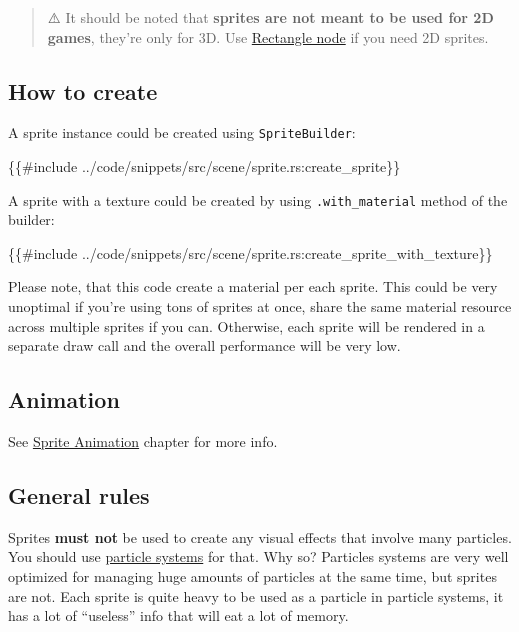\documentclass[
]{book}
\newenvironment{Shaded}{\begin{snugshade}}{\end{snugshade}}
\newcommand{\NormalTok}[1]{#1}
\theoremstyle{definition}
\theoremstyle{definition}
\theoremstyle{definition}
\theoremstyle{definition}
\theoremstyle{remark}
\begin{document}
\begin{quote}
⚠️ It should be noted that \textbf{sprites are not meant to be used for 2D games}, they're only for 3D. Use \href{./rectangle.md}{Rectangle node} if you need 2D sprites.
\end{quote}

\subsection{How to create}\label{how-to-create-4}

A sprite instance could be created using \texttt{SpriteBuilder}:

\begin{Shaded}
\begin{Highlighting}[]
\NormalTok{\{\{\#include ../code/snippets/src/scene/sprite.rs:create\_sprite\}\}}
\end{Highlighting}
\end{Shaded}

A sprite with a texture could be created by using \texttt{.with\_material} method of the builder:

\begin{Shaded}
\begin{Highlighting}[]
\NormalTok{\{\{\#include ../code/snippets/src/scene/sprite.rs:create\_sprite\_with\_texture\}\}}
\end{Highlighting}
\end{Shaded}

Please note, that this code create a material per each sprite. This could be very unoptimal if you're using tons of sprites at once, share the same material resource across multiple sprites if you can. Otherwise, each sprite will be rendered in a separate draw call and the overall performance will be very low.

\subsection{Animation}\label{animation-2}

See \href{../animation/spritesheet/spritesheet.md}{Sprite Animation} chapter for more info.

\subsection{General rules}\label{general-rules}

Sprites \textbf{must not} be used to create any visual effects that involve many particles. You should use \href{particle_system_node.md}{particle systems} for that. Why so? Particles systems are very well optimized for managing huge amounts of particles at the same time, but sprites are not. Each sprite is quite heavy to be used as a particle in particle systems, it has a lot of ``useless'' info that will eat a lot of memory.
\end{document}
